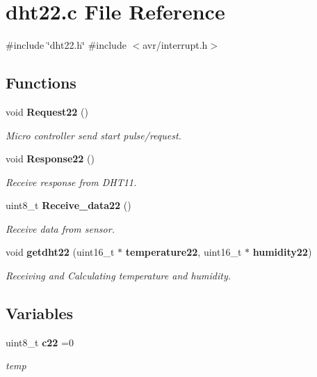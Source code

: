 \section{dht22.\+c File Reference}
\label{dht22_8c}
{\ttfamily \#include \char`\"{}dht22.\+h\char`\"{}}\newline
{\ttfamily \#include $<$avr/interrupt.\+h$>$}\newline
\subsection*{Functions}
\begin{DoxyCompactItemize}
\item 
void \textbf{ Request22} ()
\begin{DoxyCompactList}\small\item\em Micro controller send start pulse/request. \end{DoxyCompactList}\item 
void \textbf{ Response22} ()
\begin{DoxyCompactList}\small\item\em Receive response from D\+H\+T11. \end{DoxyCompactList}\item 
uint8\+\_\+t \textbf{ Receive\+\_\+data22} ()
\begin{DoxyCompactList}\small\item\em Receive data from sensor. \end{DoxyCompactList}\item 
void \textbf{ getdht22} (uint16\+\_\+t $\ast$\textbf{ temperature22}, uint16\+\_\+t $\ast$\textbf{ humidity22})
\begin{DoxyCompactList}\small\item\em Receiving and Calculating temperature and humidity. \end{DoxyCompactList}\end{DoxyCompactItemize}
\subsection*{Variables}
\begin{DoxyCompactItemize}
\item 
uint8\+\_\+t \textbf{ c22} =0
\begin{DoxyCompactList}\small\item\em temp \end{DoxyCompactList}\end{DoxyCompactItemize}



